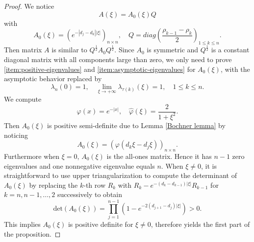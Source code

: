 \documentclass[10pt,a4paper]{amsart}
\begin{document}
\begin{proof}
    We notice
    \begin{equation}
        A(\xi)=A_0(\xi)Q
    \end{equation}
    with
    \begin{equation}\label{def Q and A0}        A_0(\xi)=(e^{-|d_j-d_k||\xi|})_{n\times n},\quad Q=diag(\frac{\rho_{k-1}-\rho_k}{2})_{1\leq k\leq n } .  \end{equation}
    Then matrix $A$ is similar to $Q^{\frac{1}{2}}A_0Q^{\frac{1}{2}}$. Since $A_0$ is symmetric and $Q^{\frac{1}{2}}$ is a constant diagonal matrix with all components large than zero, we only need to prove \ref{item:positive-eigenvalues} and \ref{item:asymptotic-eigenvalues} for $A_0(\xi)$, with the asymptotic behavior replaced by
    \begin{equation}
        \lambda_n(0)=1,\quad\lim_{\xi\rightarrow+\infty}\lambda_{\tau(k)}(\xi)=1,\quad 1\leq k\leq n.
    \end{equation}
    We compute
    \begin{equation}
        \varphi(x)=e^{-|x|},\quad\widehat{\varphi}(\xi)= \frac{2}{1+\xi^2}.
    \end{equation}
    Then $A_0(\xi)$ is positive semi-definite  due to Lemma \ref{Bochner lemma} by noticing
    \begin{equation}
        A_0(\xi)=(\varphi(d_k\xi-d_j\xi))_{n\times n}.
    \end{equation}
    Furthermore when $\xi=0$, $A_0(\xi)$ is the all-ones matrix. Hence it has $n-1$ zero eigenvalues and one nonnegative eigenvalue equals $n$. When $\xi\neq 0$, it is straightforward to use upper triangularization to compute the determinant of $A_0(\xi)$ by replacing the $k$-th row $R_k$ with $R_k-e^{-(d_k-d_{k-1})|\xi|}R_{k-1}$ for $k=n,n-1,\dots,2$ successively to obtain
    \begin{equation}
        \text{det}(A_0(\xi))=\prod_{j=1}^{n-1}\left(1-e^{-2(d_{j+1}-d_j)|\xi|}\right)>0.
    \end{equation}
    This implies $A_0(\xi)$ is positive definite for $\xi\neq0$, therefore yields the first part of the proposition.


\end{proof}
\end{document}
